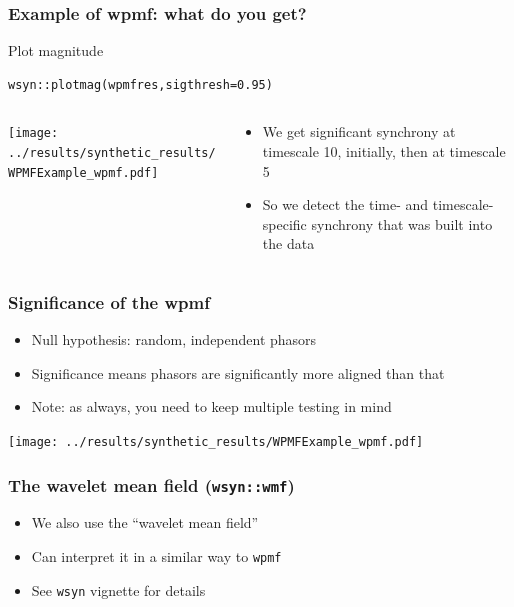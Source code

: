 \documentclass{beamer}
\begin{document}
\begin{frame}[fragile]
\frametitle{Example of wpmf: what do you get?}
\begin{exampleblock}{Plot magnitude}
\begin{verbatim}
wsyn::plotmag(wpmfres,sigthresh=0.95)
\end{verbatim}
\end{exampleblock}
\begin{columns}[c]
\begin{column}{6cm}
\texttt{[image: ../results/synthetic\_results/WPMFExample\_wpmf.pdf]}
\end{column}
\begin{column}{6cm}
\begin{itemize}
\item We get significant synchrony at timescale 10, initially, then at timescale 5
\item So we detect the time- and timescale-specific synchrony that was built into the data
\end{itemize}
\end{column}
\end{columns}
\end{frame}

\begin{frame}
\frametitle{Significance of the wpmf}
\begin{itemize}
\item Null hypothesis: random, independent phasors
\item Significance means phasors are significantly more aligned than that
\item Note: as always, you need to keep multiple testing in mind
\end{itemize}
\begin{center}
\texttt{[image: ../results/synthetic\_results/WPMFExample\_wpmf.pdf]}
\end{center}
\end{frame}

\begin{frame}
\frametitle{The wavelet mean field (\texttt{wsyn::wmf})}
  \begin{itemize}
    \item We also use the ``wavelet mean field'' %
    \item Can interpret it in a similar way to \texttt{wpmf}
    \item See \texttt{wsyn} vignette for details %
  \end{itemize}
\end{frame}
\end{document}
